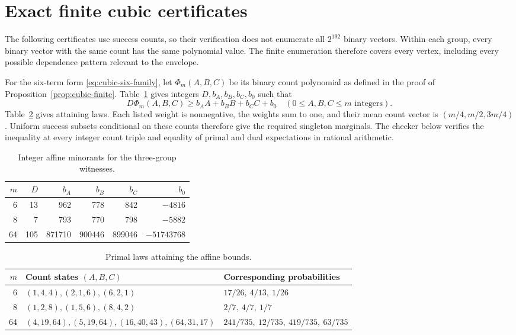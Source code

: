 \section{Exact finite cubic certificates}\label{app:cubic-certificates}
The following certificates use success counts, so their verification does
not enumerate all $2^{192}$ binary vectors. Within each group, every
binary vector with the same count has the same polynomial value. The
finite enumeration therefore covers every vertex, including every
possible dependence pattern relevant to the envelope.

For the six-term form \eqref{eq:cubic-six-family}, let
$\Phi_m(A,B,C)$ be its binary count polynomial as defined in the proof of
Proposition~\ref{prop:cubic-finite}. Table~\ref{tab:cubic-duals} gives
integers $D,b_A,b_B,b_C,b_0$ such that
\begin{equation}\label{eq:cubic-integer-dual}
 D\Phi_m(A,B,C)\ge b_AA+b_BB+b_CC+b_0
       \quad(0\le A,B,C\le m\text{ integers}).
\end{equation}
Table~\ref{tab:cubic-primals} gives attaining laws. Each listed weight is
nonnegative, the weights sum to one, and their mean count vector is
$(m/4,m/2,3m/4)$. Uniform success subsets conditional on these counts
therefore give the required singleton marginals. The checker below
verifies the inequality at every integer count triple and equality of
primal and dual expectations in rational arithmetic.

\begin{table}[htbp]
\centering
\begin{tabular}{rrrrrr}
\toprule
$m$&$D$&$b_A$&$b_B$&$b_C$&$b_0$\\\midrule
6&13&962&778&842&$-4816$\\
8&7&793&770&798&$-5882$\\
64&105&871710&900446&899046&$-51743768$\\\bottomrule
\end{tabular}
\caption{Integer affine minorants for the three-group witnesses.}
\label{tab:cubic-duals}
\end{table}

\begin{table}[htbp]
\centering
\begin{tabular}{rll}
\toprule
$m$&Count states $(A,B,C)$&Corresponding probabilities\\\midrule
6&$(1,4,4),(2,1,6),(6,2,1)$&$17/26,\ 4/13,\ 1/26$\\
8&$(1,2,8),(1,5,6),(8,4,2)$&$2/7,\ 4/7,\ 1/7$\\
64&$(4,19,64),(5,19,64),(16,40,43),(64,31,17)$
 &$241/735,\ 12/735,\ 419/735,\ 63/735$\\\bottomrule
\end{tabular}
\caption{Primal laws attaining the affine bounds.}
\label{tab:cubic-primals}
\end{table}

